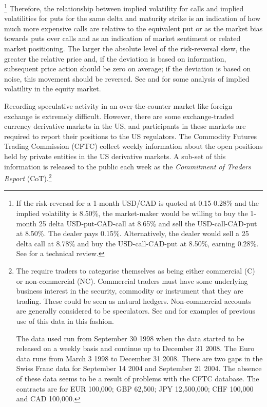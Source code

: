 \documentclass[ijfs,article,submit,oneauthor,pdftex,10pt,a4paper]{mdpi}
\begin{document}
  \footnote{If the risk-reversal for a 1-month USD/CAD is quoted at 0.15-0.28\% and the implied volatility is 8.50\%, the market-maker would be willing to buy the 1-month 25 delta USD-put-CAD-call at 8.65\% and sell the USD-call-CAD-put at 8.50\%.  The dealer pays 0.15\%.  Alternatively, the dealer would sell a 25 delta call at 8.78\% and buy the USD-call-CAD-put at 8.50\%, earning 0.28\%. See \citet{Global} for a technical review. }  Therefore, the relationship between implied volatility for calls and implied volatilities for puts for the same delta and maturity strike is an indication of how much more expensive calls are relative to the equivalent put or as the market bias towards puts over calls and as an indication of market sentiment or related market positioning.  The larger the absolute level of the risk-reversal skew, the greater the relative price and, if the deviation is based on information, subsequent price action should be zero on average; if the deviation is based on noise, this movement should be reversed.  See \citet{Yan2011} and \citet{FengZhangFriesen} for some analysis of implied volatility in the equity market. 

Recording speculative activity in an over-the-counter market like foreign exchange is extremely difficult.  However, there are some exchange-traded currency derivative markets in the US, and participants in these markets are required to report their positions to the US regulators.  The Commodity Futures Trading Commission (CFTC) collect weekly information about the open positions held by private entities in the US derivative markets.   A sub-set of this information is released to the public each week as the \emph{Commitment of Traders Report} (CoT).\footnote{The \citet{cot} require traders to categorise themselves as being either commercial (C) or non-commercial (NC).  Commercial traders must have some underlying business interest in the security, commodity or instrument that they are trading.  These could be seen as natural hedgers.  Non-commercial accounts are generally considered to be speculators.  See \citet{FuturesSanders} and \citet{FuturesWang} for examples of previous use of this data in this fashion.  
 
The data used run from September 30 1998 when the data started to be released on a weekly basis and continue up to December 31 2008.  The Euro data runs from March 3 1998 to December 31 2008.  There are two gaps in the Swiss Franc data for September 14 2004 and September 21 2004.  The absence of these data seems to be a result of problems with the CFTC database.  The contracts are for EUR 100,000; GBP 62,500; JPY 12,500,000; CHF 100,000 and CAD 100,000.}  
\end{document}
